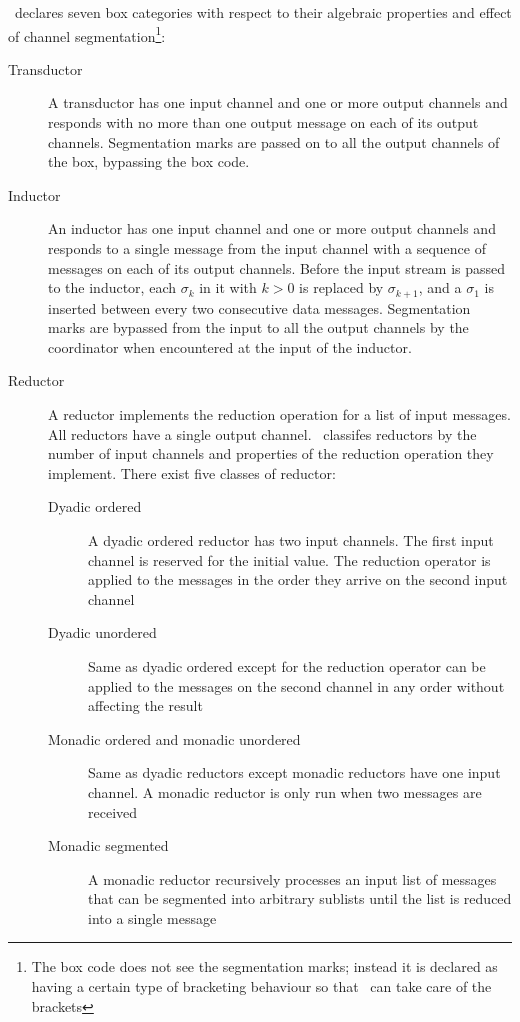 \ak\ declares seven box categories with respect to their algebraic properties and effect of channel segmentation\footnote{The box code does not see the segmentation marks; instead it is declared as having a certain type of bracketing behaviour so that \ak\ can take care of the brackets}:
\begin{description}
\item[Transductor]
A transductor has one input channel and one or more output channels and responds with no more than one output message on each of its output channels. Segmentation marks are passed on to all the output channels of the box, bypassing the box code.

\item[Inductor]
An inductor has one input channel and one or more output channels and responds to a single message from the input channel with a sequence of messages on each of its output channels. Before the input stream is passed to the inductor, each $\sigma_k$ in it with $k > 0$ is replaced by $\sigma_{k+1}$, and a $\sigma_1$ is inserted between every two consecutive data messages. Segmentation marks are bypassed from the input to all the output channels by the coordinator when encountered at the input of the inductor.

\item[Reductor] A reductor implements the reduction operation for a list of input messages. All reductors have a single output channel. \ak\ classifes reductors by the number of input channels and properties of the reduction operation they implement. There exist five classes of reductor:

    \begin{description}
    \item[Dyadic ordered] A dyadic ordered reductor has two input channels. The first input channel is reserved for the initial value. The reduction operator is applied to the messages in the order they arrive on the second input channel

    \item[Dyadic unordered] Same as dyadic ordered except for the reduction operator can be applied to the messages on the second channel in any order without affecting the result

    \item[Monadic ordered and monadic unordered] Same as dyadic reductors except monadic reductors have one input channel. A monadic reductor is only run when two messages are received

    \item[Monadic segmented] A monadic reductor recursively processes an input list of messages that can be segmented into arbitrary sublists until the list is reduced into a single message
    \end{description}
\end{description}



